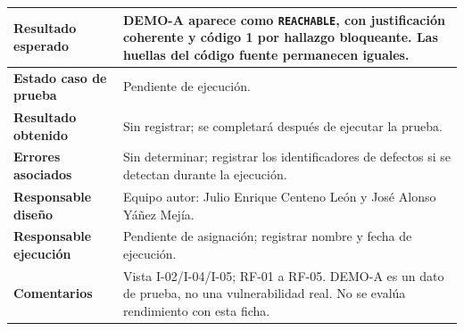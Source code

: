 \begin{table}[H]
\begin{tabularx}{\textwidth}{|P{4.15cm}|Y|}
\textbf{Resultado esperado} & DEMO-A aparece como \texttt{REACHABLE}, con justificación coherente y código 1 por hallazgo bloqueante. Las huellas del código fuente permanecen iguales. \\ \hline
\textbf{Estado caso de prueba} & Pendiente de ejecución. \\ \hline
\textbf{Resultado obtenido} & Sin registrar; se completará después de ejecutar la prueba. \\ \hline
\textbf{Errores asociados} & Sin determinar; registrar los identificadores de defectos si se detectan durante la ejecución. \\ \hline
\textbf{Responsable diseño} & Equipo autor: Julio Enrique Centeno León y José Alonso Yáñez Mejía. \\ \hline
\textbf{Responsable ejecución} & Pendiente de asignación; registrar nombre y fecha de ejecución. \\ \hline
\textbf{Comentarios} & Vista I-02/I-04/I-05; RF-01 a RF-05. DEMO-A es un dato de prueba, no una vulnerabilidad real. No se evalúa rendimiento con esta ficha. \\ \hline
\end{tabularx}
\end{table}
\clearpage
